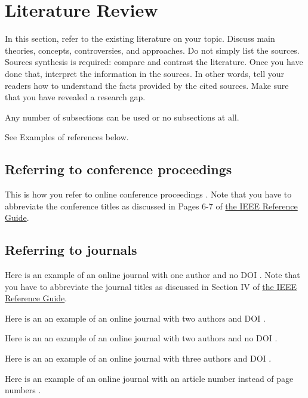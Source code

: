 \documentclass[oneside,final,12pt,a4paper]{extreport}
\begin{document}
\section{Literature Review}

In this section, refer to the existing literature on your topic. Discuss main theories, concepts, controversies, and approaches. Do not simply list the sources. Sources synthesis is required: compare and contrast the literature. Once you have done that, interpret the information in the sources. In other words, tell your readers how to understand the facts provided by the cited sources. Make sure that you have revealed a research gap.

Any number of subsections can be used or no subsections at all.

See Examples of references below.
\subsection{Referring to conference proceedings}
\label{sec:subsection1}

This is how you refer to online conference proceedings \cite{FosterEtAl:2003}. Note that you have to abbreviate the conference titles as discussed in Pages 6-7 of \href{https://journals.ieeeauthorcenter.ieee.org/wp-content/uploads/sites/7/IEEE_Reference_Guide.pdf}{the IEEE Reference Guide}.

\subsection{Referring to journals}
\label{sec:subsection2}

Here is an example of an online journal with one author and no DOI \cite{Poock2002GraduateSO}. Note that you have to abbreviate the journal titles as discussed in Section IV of \href{https://journals.ieeeauthorcenter.ieee.org/wp-content/uploads/sites/7/IEEE_Reference_Guide.pdf}{the IEEE Reference Guide}.

Here is an an example of an online journal with two authors and DOI \cite{Hullinger2014STUDENTAE}.

Here is an an example of an online journal with two authors and no DOI \cite{Oswalt2007WhatTD}.

Here is an an example of an online journal with three authors and DOI \cite{PARK2022144}.

Here is an example of an online journal with an article number instead of page numbers \cite{HERNANDEZRUIZ2022101953}.
\end{document}
